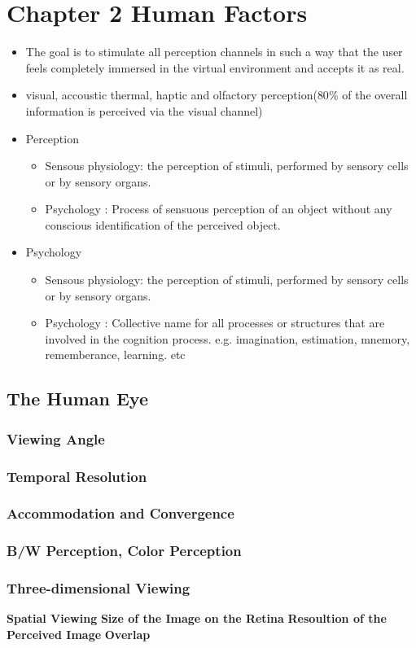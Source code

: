 \documentclass{standalone}
\begin{document}
\section{Chapter 2 Human Factors}
\begin{itemize}
	\item The goal is to stimulate all perception channels in such a way that the user feels completely immersed in the virtual environment and accepts it as real.
	\item visual, accoustic thermal, haptic and olfactory perception($80 \%$ of the overall information is perceived via the visual channel)
	\item Perception
		\begin{itemize}
		\item Sensous physiology: the perception of stimuli, performed by sensory cells or by sensory organs.
		\item Psychology : Process of sensuous perception of an object without any conscious identification of the perceived object.
		\end{itemize}
		\item Psychology
			\begin{itemize}
				\item Sensous physiology: the perception of stimuli, performed by sensory cells or by sensory organs.
				\item Psychology : Collective name for all processes or structures that are involved in the cognition process. e.g. imagination, estimation, mnemory, rememberance, learning. etc
	\end{itemize}
\end{itemize}

\subsection{The Human Eye}

\subsubsection*{Viewing Angle}
\subsubsection{Temporal Resolution}

\subsubsection{Accommodation and Convergence}

\subsubsection{B/W Perception, Color Perception}
\subsubsection{Three-dimensional Viewing}

\textbf{Spatial Viewing}
\textbf{Size of the Image on the Retina}
\textbf{Resoultion of the Perceived Image}
\textbf{Overlap}
\end{document}
